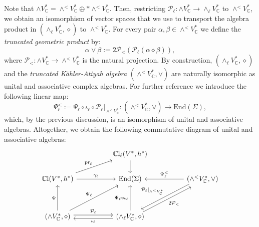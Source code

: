 \documentclass[10pt,a4paper,twoside,reqno]{amsart}
\theoremstyle{plain}
\theoremstyle{definition}
\theoremstyle{remark}
\newcommand{\End}{\mathrm{End}}
\def\C{\mathbb{C}}
\def\cP{\mathcal{P}}
\def\cP{\mathcal{P}}
\begin{document}
Note that $\wedge V^*_\C=\wedge^<V_\C^*\oplus*\wedge^<V^*_\C$. Then, restricting $\cP_\ell\colon\wedge V^*_\C\to\wedge_\ell V^*_\C$ to $\wedge^<V^*_\C$, we obtain an isomorphism of vector spaces that we use to transport the algebra product in $(\wedge_\ell V^*_\C,\diamond)$ to $\wedge^<V^*_\C$. For every pair $\alpha,\beta\in\wedge^<V^*_\C$ we define the \emph{truncated geometric product} by: $$\alpha\vee\beta:=2\cP_<(\cP_\ell(\alpha\diamond\beta)),$$ where $\cP_<\colon\wedge V^*_\C\to\wedge^<V^*_\C$ is the natural projection. By construction, $(\wedge_\ell V^*_\C,\diamond)$ and the \emph{truncated Kähler-Atiyah algebra} $(\wedge^<V^*_\C,\vee)$ are naturally isomorphic as unital and associative complex algebras. For further reference we introduce the following linear map: \begin{equation}\label{eq:truncated_iso}
    \Psi^<_\ell:=\Psi_\ell\circ\iota_\ell\circ\cP_\ell\vert_{\wedge^<V^*_\C}\colon(\wedge^<V^*_\C,\vee)\to\End(\Sigma),
\end{equation} which, by the previous discussion, is an isomorphism of unital and associative algebras. Altogether, we obtain the following commutative diagram of unital and associative algebras:
$$\begin{tikzcd}
                                                                                                                                                        &  & {\mathbb{C}\mathrm{l}_\ell(V^*,h^*)} \arrow[d]                                                                                                                                   &  &                                                                                                                                           \\
{\mathbb{C}\mathrm{l}(V^*,h^*)} \arrow[rru, "\mathrm{pr}_\ell"] \arrow[rr, "\gamma_\ell"]                                                  &  & \mathrm{End}(\Sigma)                                                                                                                                                             &  & {(\wedge^<V^*_{\mathbb{C}},\vee)} \arrow[ll, "\Psi^<_\ell"'] \arrow[lldd, "\mathcal{P}_\ell|_{\wedge^<V^*_{\mathbb{C}}}"', shift right] \\
                                                                                                                                                        &  &                                                                                                                                                                                  &  &                                                                                                                                           \\
{(\wedge V^*_{\mathbb{C}},\diamond)} \arrow[uu, "\Psi"] \arrow[rruu, "\Psi_\ell"] \arrow[rr, "\mathcal{P}_\ell", shift left] &  & {(\wedge_\ell V^*_{\mathbb{C}},\diamond)} \arrow[uu, "\Psi_\ell\circ\iota_\ell"] \arrow[ll, "\iota_\ell", shift left] \arrow[rruu, "2\mathcal{P}_<"', shift right] &  &                                                                                                                                          
\end{tikzcd}$$
\end{document}

